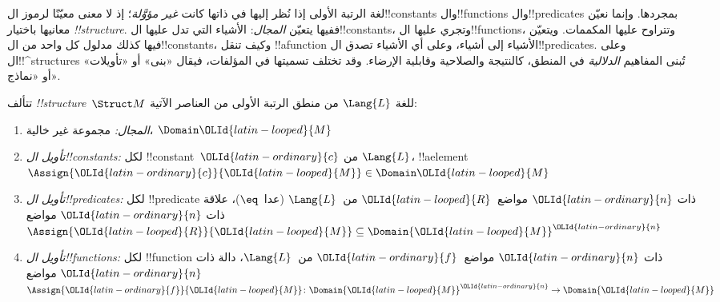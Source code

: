 \documentclass[../../../include/open-logic-section]{subfiles}
\begin{document}


\begin{explain}
لغة الرتبة الأولى إذا نُظر إليها في ذاتها كانت \emph{غير مؤوَّلة}؛
إذ لا معنى معيّنًا لرموز ال!!{constant}s وال!!{function}s
وال!!{predicate}s بمجردها. وإنما نعيّن معانيها باختيار
 \emph{!!{structure}}. ففيها يتعيّن
\emph{المجال}: الأشياء التي تدل عليها ال!!{constant}s، وتجري
عليها ال!!{function}s، وتتراوح عليها المكممات. ويتعيّن فيها كذلك
مدلول كل واحد من ال!!{constant}s، وكيف تنقل !!a{function} الأشياء
إلى أشياء، وعلى أي الأشياء تصدق ال!!{predicate}s.
وعلى ال!!^{structure}s تُبنى المفاهيم \emph{الدلالية} في المنطق،
كالنتيجة والصلاحية وقابلية الإرضاء. وقد تختلف تسميتها في
المؤلفات، فيقال «بنى» أو «تأويلات» أو «نماذج».
\end{explain}

\begin{defn}[!!^{structure}s]
تتألف  \emph{!!{structure}}~$\Struct M$ للغة
$\Lang{L}$ من منطق الرتبة الأولى من العناصر الآتية:
\begin{enumerate}
\item \emph{المجال:} مجموعة غير خالية، $\Domain \OLId{latin-looped}{M}$
\item \emph{تأويل ال!!{constant}s:} لكل !!{constant}~$\OLId{latin-ordinary}{c}$ من
  $\Lang{L}$، !!a{element}~$\Assign{\OLId{latin-ordinary}{c}}{\OLId{latin-looped}{M}} \in \Domain \OLId{latin-looped}{M}$
\item \emph{تأويل ال!!{predicate}s:} لكل !!{predicate} ذات
  $\OLId{latin-ordinary}{n}$ مواضع~$\OLId{latin-looped}{R}$ من~$\Lang{L}$ (عدا~$\eq$)، علاقة ذات $\OLId{latin-ordinary}{n}$ مواضع
  $\Assign{\OLId{latin-looped}{R}}{\OLId{latin-looped}{M}} \subseteq \Domain{\OLId{latin-looped}{M}}^\OLId{latin-ordinary}{n}$
\item \emph{تأويل ال!!{function}s:} لكل !!{function} ذات
  $\OLId{latin-ordinary}{n}$ مواضع~$\OLId{latin-ordinary}{f}$ من~$\Lang{L}$، دالة ذات $\OLId{latin-ordinary}{n}$ مواضع
  $\Assign{\OLId{latin-ordinary}{f}}{\OLId{latin-looped}{M}} \colon \Domain{\OLId{latin-looped}{M}}^\OLId{latin-ordinary}{n} \to \Domain{\OLId{latin-looped}{M}}$
\end{enumerate}
\end{defn}
\end{document}
